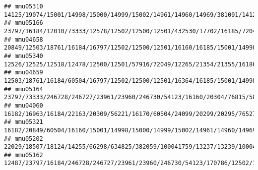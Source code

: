 \documentclass[
]{article}
\begin{document}
\begin{verbatim}
## mmu05310                                                                                                                                                                                              14125/19074/15001/14998/15000/14999/15002/14961/14960/14969/381091/14126
## mmu05166                                           23797/16184/12010/73333/12578/12502/12500/12501/432530/17702/16185/72049/14972/15001/14998/15000/14999/15002/14961/14960/14969/381091/15006/15013/15015/110557/15018/110558/15039/100529082/15024/630294/667977/14990/16186
## mmu04658                                                                                                                                              20849/12503/18761/16184/16797/12502/12500/12501/16160/16185/15001/14998/15000/14999/15002/14961/14960/14969/381091/16186
## mmu05340                                                                                                                                                                                         12526/12525/12518/12478/12500/12501/57916/72049/12265/21354/21355/16186/12229
## mmu04659                                                                                                                                        12503/18761/16184/60504/16797/12502/12500/12501/16364/16185/15001/14998/15000/14999/15002/14961/14960/14969/381091/20371/16186
## mmu05164                                                                                            23797/73333/246728/246727/23961/23960/246730/54123/16160/20304/76815/58185/12265/17857/17858/100503895/17229/15001/14998/15000/14999/15002/14961/14960/14969/381091/170722
## mmu04060                                                    16182/16963/16184/22163/20309/56221/16170/60504/24099/20299/20295/76527/12145/252837/12773/23832/14561/16160/57916/20306/20307/20304/20303/18053/12775/12777/56838/29820/21943/16185/72049/12458/16994/16186/12766
## mmu05321                                                                                                                                                                            16182/20849/60504/16160/15001/14998/15000/14999/15002/14961/14960/14969/381091/20371/16186
## mmu05202                                                                          22029/18507/18124/14255/66298/634825/382059/100041759/13237/13239/100041890/626682/626708/100041952/503491/18791/17392/235320/12047/17268/18053/20474/319152/319153/16185/16421/104156/12475
## mmu05162                                                                                                                                    12487/23797/16184/246728/246727/23961/23960/246730/54123/170786/12502/12500/12501/81897/16160/16185/17857/17858/15511/193740/16186

\end{verbatim}
\end{document}
